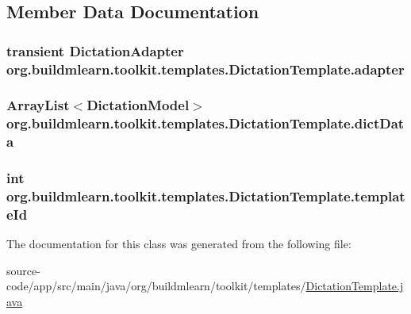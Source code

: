 \subsection{Member Data Documentation}
\subsubsection[{\texorpdfstring{adapter}{adapter}}]{\setlength{\rightskip}{0pt plus 5cm}transient Dictation\+Adapter org.\+buildmlearn.\+toolkit.\+templates.\+Dictation\+Template.\+adapter\hspace{0.3cm}{\ttfamily [private]}}\hypertarget{classorg_1_1buildmlearn_1_1toolkit_1_1templates_1_1DictationTemplate_aa96617a4a9b2a3b644f09014d3764081}{}\label{classorg_1_1buildmlearn_1_1toolkit_1_1templates_1_1DictationTemplate_aa96617a4a9b2a3b644f09014d3764081}
\subsubsection[{\texorpdfstring{dict\+Data}{dictData}}]{\setlength{\rightskip}{0pt plus 5cm}Array\+List$<${\bf Dictation\+Model}$>$ org.\+buildmlearn.\+toolkit.\+templates.\+Dictation\+Template.\+dict\+Data\hspace{0.3cm}{\ttfamily [private]}}\hypertarget{classorg_1_1buildmlearn_1_1toolkit_1_1templates_1_1DictationTemplate_a95030ad007d0a8047accfdd29b62588b}{}\label{classorg_1_1buildmlearn_1_1toolkit_1_1templates_1_1DictationTemplate_a95030ad007d0a8047accfdd29b62588b}
\subsubsection[{\texorpdfstring{template\+Id}{templateId}}]{\setlength{\rightskip}{0pt plus 5cm}int org.\+buildmlearn.\+toolkit.\+templates.\+Dictation\+Template.\+template\+Id\hspace{0.3cm}{\ttfamily [private]}}\hypertarget{classorg_1_1buildmlearn_1_1toolkit_1_1templates_1_1DictationTemplate_a4ad8d52a9cf5c27a33391d252a0fae02}{}\label{classorg_1_1buildmlearn_1_1toolkit_1_1templates_1_1DictationTemplate_a4ad8d52a9cf5c27a33391d252a0fae02}


The documentation for this class was generated from the following file\+:\begin{DoxyCompactItemize}
\item 
source-\/code/app/src/main/java/org/buildmlearn/toolkit/templates/\hyperlink{DictationTemplate_8java}{Dictation\+Template.\+java}\end{DoxyCompactItemize}
